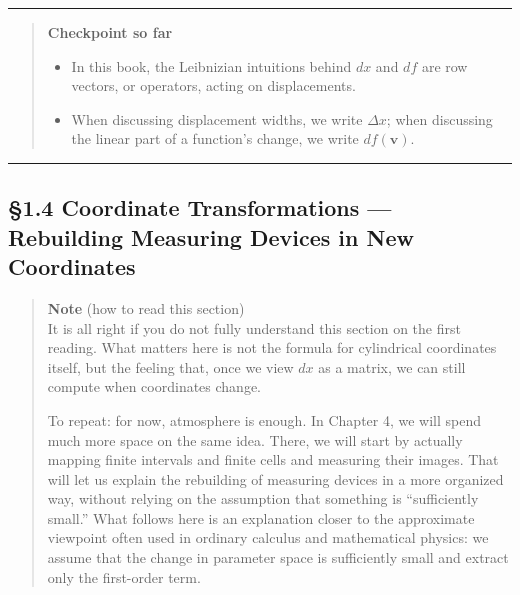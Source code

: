 \begin{center}\rule{0.5\linewidth}{0.5pt}\end{center}

\begin{quote}
\textbf{Checkpoint so far}

\begin{itemize}
\item
  In this book, the Leibnizian intuitions behind \(dx\) and \(df\) are
  row vectors, or operators, acting on displacements.
\item
  When discussing displacement widths, we write \(\Delta x\); when
  discussing the linear part of a function's change, we write
  \(df(\mathbf{v})\).
\end{itemize}
\end{quote}

\begin{center}\rule{0.5\linewidth}{0.5pt}\end{center}

\hypertarget{coordinate-transformations-rebuilding-measuring-devices-in-new-coordinates}{%
\subsection{§1.4 Coordinate Transformations --- Rebuilding Measuring
Devices in New
Coordinates}\label{coordinate-transformations-rebuilding-measuring-devices-in-new-coordinates}}

\begin{quote}
\textbf{Note} (how to read this section)\\
It is all right if you do not fully understand this section on the first
reading. What matters here is not the formula for cylindrical
coordinates itself, but the feeling that, once we view \(dx\) as a
matrix, we can still compute when coordinates change.

To repeat: for now, atmosphere is enough. In Chapter 4, we will spend
much more space on the same idea. There, we will start by actually
mapping finite intervals and finite cells and measuring their images.
That will let us explain the rebuilding of measuring devices in a more
organized way, without relying on the assumption that something is
``sufficiently small.'' What follows here is an explanation closer to
the approximate viewpoint often used in ordinary calculus and
mathematical physics: we assume that the change in parameter space is
sufficiently small and extract only the first-order term.
\end{quote}

